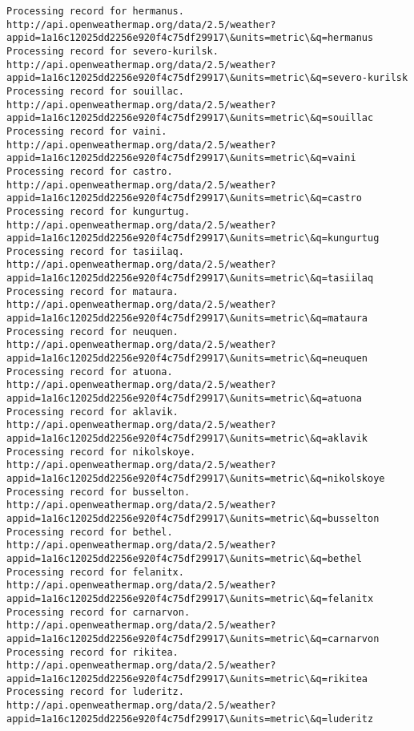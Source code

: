\documentclass[11pt]{article}
\begin{document}
    \begin{Verbatim}[commandchars=\\\{\}]
Processing record for hermanus.
http://api.openweathermap.org/data/2.5/weather?appid=1a16c12025dd2256e920f4c75df29917\&units=metric\&q=hermanus
Processing record for severo-kurilsk.
http://api.openweathermap.org/data/2.5/weather?appid=1a16c12025dd2256e920f4c75df29917\&units=metric\&q=severo-kurilsk
Processing record for souillac.
http://api.openweathermap.org/data/2.5/weather?appid=1a16c12025dd2256e920f4c75df29917\&units=metric\&q=souillac
Processing record for vaini.
http://api.openweathermap.org/data/2.5/weather?appid=1a16c12025dd2256e920f4c75df29917\&units=metric\&q=vaini
Processing record for castro.
http://api.openweathermap.org/data/2.5/weather?appid=1a16c12025dd2256e920f4c75df29917\&units=metric\&q=castro
Processing record for kungurtug.
http://api.openweathermap.org/data/2.5/weather?appid=1a16c12025dd2256e920f4c75df29917\&units=metric\&q=kungurtug
Processing record for tasiilaq.
http://api.openweathermap.org/data/2.5/weather?appid=1a16c12025dd2256e920f4c75df29917\&units=metric\&q=tasiilaq
Processing record for mataura.
http://api.openweathermap.org/data/2.5/weather?appid=1a16c12025dd2256e920f4c75df29917\&units=metric\&q=mataura
Processing record for neuquen.
http://api.openweathermap.org/data/2.5/weather?appid=1a16c12025dd2256e920f4c75df29917\&units=metric\&q=neuquen
Processing record for atuona.
http://api.openweathermap.org/data/2.5/weather?appid=1a16c12025dd2256e920f4c75df29917\&units=metric\&q=atuona
Processing record for aklavik.
http://api.openweathermap.org/data/2.5/weather?appid=1a16c12025dd2256e920f4c75df29917\&units=metric\&q=aklavik
Processing record for nikolskoye.
http://api.openweathermap.org/data/2.5/weather?appid=1a16c12025dd2256e920f4c75df29917\&units=metric\&q=nikolskoye
Processing record for busselton.
http://api.openweathermap.org/data/2.5/weather?appid=1a16c12025dd2256e920f4c75df29917\&units=metric\&q=busselton
Processing record for bethel.
http://api.openweathermap.org/data/2.5/weather?appid=1a16c12025dd2256e920f4c75df29917\&units=metric\&q=bethel
Processing record for felanitx.
http://api.openweathermap.org/data/2.5/weather?appid=1a16c12025dd2256e920f4c75df29917\&units=metric\&q=felanitx
Processing record for carnarvon.
http://api.openweathermap.org/data/2.5/weather?appid=1a16c12025dd2256e920f4c75df29917\&units=metric\&q=carnarvon
Processing record for rikitea.
http://api.openweathermap.org/data/2.5/weather?appid=1a16c12025dd2256e920f4c75df29917\&units=metric\&q=rikitea
Processing record for luderitz.
http://api.openweathermap.org/data/2.5/weather?appid=1a16c12025dd2256e920f4c75df29917\&units=metric\&q=luderitz

\end{Verbatim}
\end{document}
